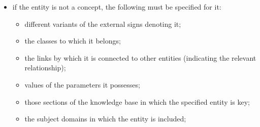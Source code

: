 \documentclass{scndocument}
\begin{document}
\begin{multicols}{2}
\begin{itemize}
    \item if the entity is not a concept, the following must be
specified for it:
    \begin{itemize}
        \item different variants of the external signs denoting it;
    \end{itemize}
    \begin{itemize}
        \item the classes to which it belongs;
    \end{itemize}
    \begin{itemize}
        \item the links by which it is connected to other entities (indicating the relevant relationship);
    \end{itemize}
    \begin{itemize}
        \item values of the parameters it possesses;
    \end{itemize}
    \begin{itemize}
        \item those sections of the knowledge base in which the specified entity is key;
    \end{itemize}
    \begin{itemize}
        \item the subject domains in which the entity is included;
    \end{itemize}
    
\end{itemize}


\end{multicols}
\end{document}
